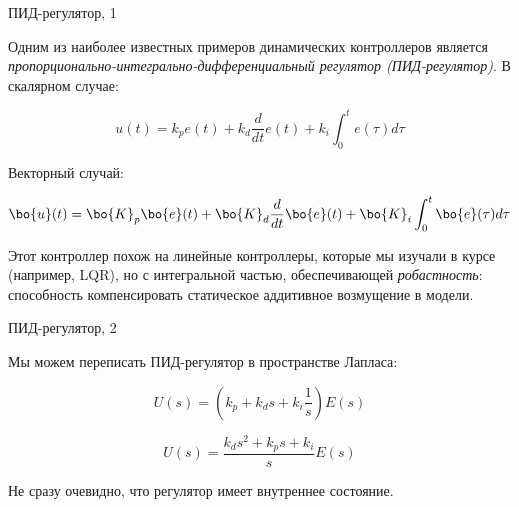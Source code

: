 \documentclass{beamer}
\begin{document}
\begin{frame}{ПИД-регулятор, 1}
	\begin{flushleft}
		
		Одним из наиболее известных примеров динамических контроллеров является \emph{пропорционально-интегрально-дифференциальный регулятор (ПИД-регулятор)}. В скалярном случае:
		
		\begin{equation}
			u(t) = k_p e(t) + k_d \frac{d}{dt} e(t) + k_i \int_{0}^{t} e(\tau) d \tau
		\end{equation}
		
		Векторный случай:
		
		\begin{equation}
			\bo{u}(t) = \bo{K}_p \bo{e}(t) + \bo{K}_d \frac{d}{dt} \bo{e}(t) + \bo{K}_i \int_{0}^{t} \bo{e}(\tau) d \tau
		\end{equation}
		
		
		Этот контроллер похож на линейные контроллеры, которые мы изучали в курсе (например, LQR), но с интегральной частью, обеспечивающей \emph{робастность}: способность компенсировать статическое аддитивное возмущение в модели.
		
	\end{flushleft}
\end{frame}

\begin{frame}{ПИД-регулятор, 2}
	\begin{flushleft}
		
		Мы можем переписать ПИД-регулятор в пространстве Лапласа:
		
		\begin{equation}
			U(s) = \left(k_p  + k_d s + k_i \frac{1}{s} \right )E(s)
		\end{equation}
		
		\begin{equation}
			U(s) =
			\frac{k_d s^2 + k_p s + k_i }{s}E(s)
		\end{equation}
		
		Не сразу очевидно, что регулятор имеет внутреннее состояние.
		
	\end{flushleft}
\end{frame}
\end{document}
